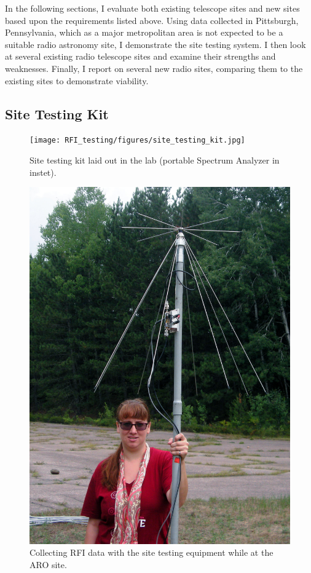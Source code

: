 In the following sections, I evaluate both existing telescope sites and new sites based upon the requirements listed above. Using data collected in Pittsburgh, Pennsylvania, which as a major metropolitan area is not expected to be a suitable radio astronomy site, I demonstrate the site testing system. I then look at several existing radio telescope sites and examine their strengths and weaknesses. Finally, I report on several new radio sites, comparing them to the existing sites to demonstrate viability. 


\subsection{Site Testing Kit} \label{Sec:site_kit}

\begin{figure}[htb]
\centering
\begin{minipage}[b]{0.47\textwidth}
\centering
\texttt{[image: RFI\_testing/figures/site\_testing\_kit.jpg]}
\caption{Site testing kit laid out in the lab (portable Spectrum Analyzer in instet).}
\label{Fig:site_kit}
\end{minipage}%
\begin{minipage}[b]{0.02\textwidth}
\hspace{1cm}
\end{minipage}%
\begin{minipage}[b]{0.47\textwidth}
\centering
\includegraphics[width=0.95\linewidth]{RFI_testing/figures/voytek_site_test_alg.jpg}
\caption{Collecting RFI data with the site testing equipment while at the ARO site.}
\label{Fig:aroant}
\end{minipage}
\end{figure}

